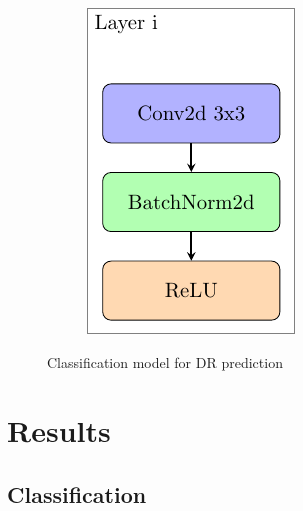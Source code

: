 \documentclass[preprint]{elsarticle}
\theoremstyle{definition} %
\theoremstyle{remark}
\begin{document}
\begin{figure}[h!]
\begin{subfigure}[b]{.30\textwidth}
		\includegraphics[width=\textwidth]{figures/modellayer.pdf}\\
		\vspace{2cm}
	\end{subfigure}
	\hfill 
	\caption{Classification model for DR prediction}  
	\label{fig:drmodel} 
\end{figure}

\section{Results}\label{sec:results}

\subsection{Classification}
\end{document}
